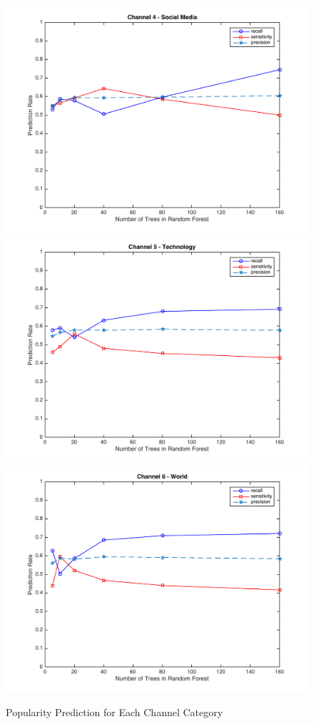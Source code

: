 \documentclass{article} %
\begin{document}
\begin{figure}[h!]
 \includegraphics[scale = 0.35]{channel_4.pdf}
 \includegraphics[scale = 0.35]{channel_5.pdf}
 \includegraphics[scale = 0.35]{channel_6.pdf}
 \caption{Popularity Prediction for Each Channel Category}
 \label{pop}
\end{figure}
\end{document}
